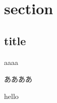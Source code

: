 \documentclass[a4paper]{jsarticle}
\begin{document}
\section{section}

  \subsection{title}
    aaaa

    ああああ

    hello



\MT
\end{document}
